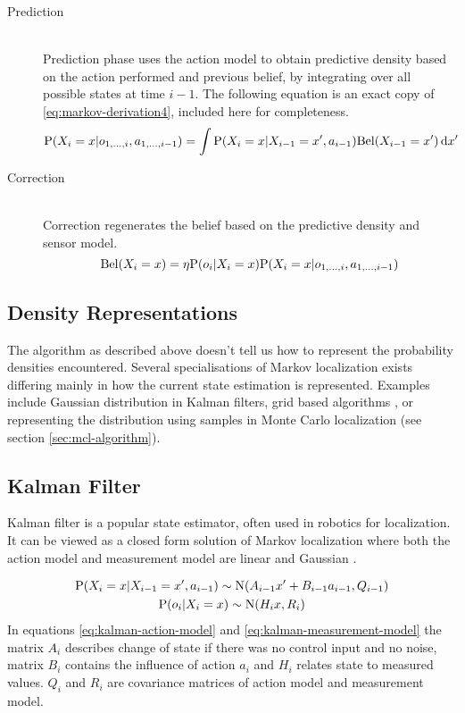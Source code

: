 \begin{description}
\item[Prediction] \hfill \\
	Prediction phase uses the action model to obtain predictive density based on the action performed
	and previous belief, by integrating over all possible states at time \(i - 1\).
	The following equation is an exact copy of \eqref{eq:markov-derivation4}, included here for completeness.
	\begin{equation}
		\label{eq:markov-prediction}
		\P(X_i = x | o_{1, \dotsc, i}, a_{1, \dotsc, i - 1}) = 
		\int
		\P(X_i = x | X_{i - 1}=x', a_{i - 1})
		\Bel(X_{i-1} = x')
		\,\mathrm{d}x'
	\end{equation}

\item[Correction] \hfill \\
	Correction regenerates the belief based on the predictive density
	and sensor model.
	\begin{equation}
		\label{eq:markov-correction}
		\Bel(X_i = x) =
		\eta \P(o_i | X_i = x)
		\P(X_i = x | o_{1, \dotsc, i}, a_{1, \dotsc, i - 1})
	\end{equation}
\end{description}

\subsection{Density Representations}
The algorithm as described above doesn't tell us how to represent the probability
densities encountered.
Several specialisations of Markov localization exists differing mainly in how the
current state estimation is represented.
Examples include Gaussian distribution in Kalman filters,
grid based algorithms \cite{fox98}, or representing the distribution
using samples in Monte Carlo localization (see section \ref{sec:mcl-algorithm}).

\subsection{Kalman Filter}
\label{sec:kalman}
Kalman filter \cite{kalman60,welch95} is a popular state estimator, often used in robotics
for localization.
It can be viewed as a closed form solution of Markov localization where both the
action model and measurement model are linear and Gaussian \cite{diard03}.

\begin{gather}
	\label{eq:kalman-action-model}
	\P(X_i = x | X_{i-1} = x', a_{i - 1}) \sim \mathrm{N}(A_{i - 1}x' + B_{i - 1}a_{i - 1}, Q_{i - 1})
	\\
	\label{eq:kalman-measurement-model}
	\P(o_{i} | X_i = x) \sim \mathrm{N}(H_{i}x, R_i)
\end{gather}
In equations \eqref{eq:kalman-action-model} and \eqref{eq:kalman-measurement-model}
the matrix \(A_i\) describes change of state if there was no control input and no noise,
matrix \(B_i\) contains the influence of action \(a_i\) and \(H_i\) relates state to measured
values.
\(Q_i\) and \(R_i\) are covariance matrices of action model and measurement model.


